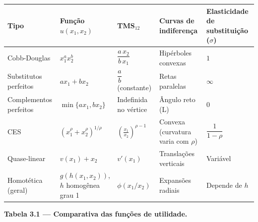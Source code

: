 \documentclass[11pt,twoside,openright]{book}
\begin{document}
{\def\LTcaptype{none} %
\begin{longtable}[]{@{}
  >{\raggedright\arraybackslash}p{}
  >{\raggedright\arraybackslash}p{}
  >{\raggedright\arraybackslash}p{}
  >{\raggedright\arraybackslash}p{}
  >{\raggedright\arraybackslash}p{}@{}}
\toprule\noalign{}
\begin{minipage}[b]{\linewidth}\raggedright
Tipo
\end{minipage} & \begin{minipage}[b]{\linewidth}\raggedright
Função \(u(x_1, x_2)\)
\end{minipage} & \begin{minipage}[b]{\linewidth}\raggedright
TMS\(_{12}\)
\end{minipage} & \begin{minipage}[b]{\linewidth}\raggedright
Curvas de indiferença
\end{minipage} & \begin{minipage}[b]{\linewidth}\raggedright
Elasticidade de substituição (\(\sigma\))
\end{minipage} \\
\midrule\noalign{}
\endhead
\bottomrule\noalign{}
\endlastfoot
Cobb-Douglas & \(x_1^a x_2^b\) & \(\dfrac{a\, x_2}{b\, x_1}\) &
Hipérboles convexas & \(1\) \\
Substitutos perfeitos & \(ax_1 + bx_2\) & \(\dfrac{a}{b}\) (constante) &
Retas paralelas & \(\infty\) \\
Complementos perfeitos & \(\min\{ax_1, bx_2\}\) & Indefinida no vértice
& Ângulo reto (L) & \(0\) \\
CES & \((x_1^{\rho}+x_2^{\rho})^{1/\rho}\) &
\(\left(\frac{x_1}{x_2}\right)^{\rho-1}\) & Convexa (curvatura varia com
\(\rho\)) & \(\dfrac{1}{1-\rho}\) \\
Quase-linear & \(v(x_1) + x_2\) & \(v'(x_1)\) & Translações verticais &
Variável \\
Homotética (geral) & \(g(h(x_1,x_2))\), \(h\) homogênea grau 1 &
\(\phi(x_1/x_2)\) & Expansões radiais & Depende de \(h\) \\
\end{longtable}
}

\textbf{Tabela 3.1 --- Comparativa das funções de utilidade.}
\end{document}

